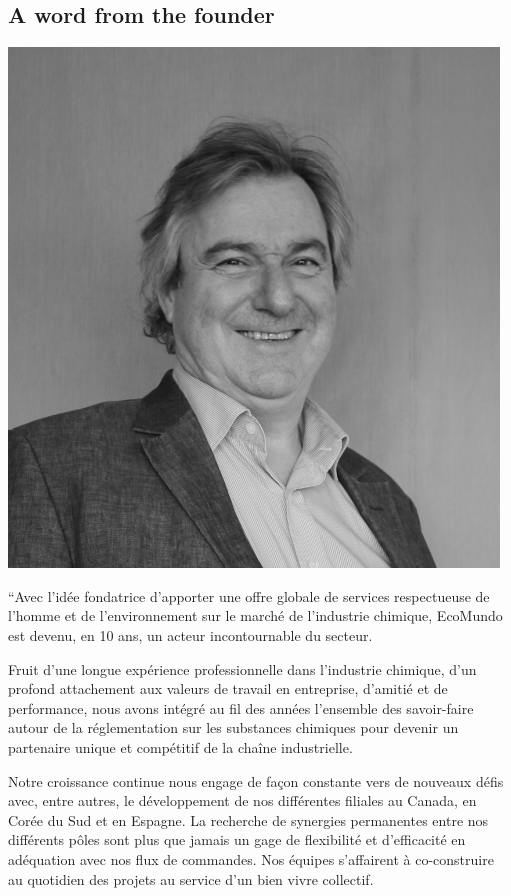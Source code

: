 \documentclass[a4paper,12pt,twoside]{report}
\begin{document}
\subsection{A word from the founder}
\includegraphics[scale=0.5]{images/pierre}

“Avec l’idée fondatrice d’apporter une offre globale de services respectueuse de l’homme et de l’environnement sur le marché de l’industrie chimique, EcoMundo est devenu, en 10 ans, un acteur incontournable du secteur. 

Fruit d’une longue expérience professionnelle dans l’industrie chimique, d’un profond attachement aux valeurs de travail en entreprise, d’amitié et de performance, nous avons intégré au fil des années l’ensemble des savoir-faire autour de la réglementation sur les substances chimiques pour devenir un partenaire unique et compétitif de la chaîne industrielle.

Notre croissance continue nous engage de façon constante vers de nouveaux défis avec, entre autres, le développement de nos différentes filiales au Canada, en Corée du Sud et en Espagne. La recherche de synergies permanentes entre nos différents pôles sont plus que jamais un gage de flexibilité et d’efficacité en adéquation avec nos flux de commandes. Nos équipes s’affairent à co-construire au quotidien des projets au service d’un bien vivre collectif.
\end{document}
